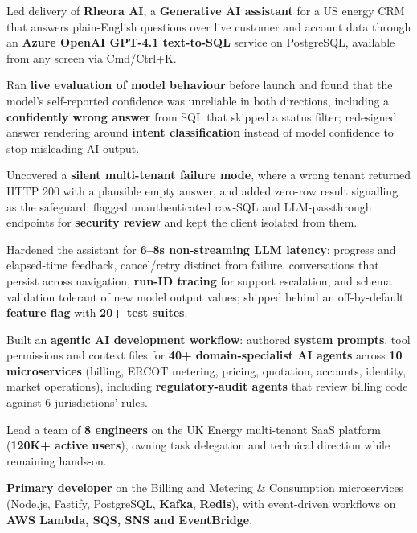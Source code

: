 \documentclass[letterpaper,11pt]{article}
\newcommand{\resumeItem}[1]{\item\small{{#1 \vspace{-2pt}}}}
\begin{document}
    \resumeItem{Led delivery of \textbf{Rheora AI}, a \textbf{Generative AI assistant} for a US energy CRM that answers plain-English questions over live customer and account data through an \textbf{Azure OpenAI GPT-4.1 text-to-SQL} service on PostgreSQL, available from any screen via Cmd/Ctrl+K.}

    \resumeItem{Ran \textbf{live evaluation of model behaviour} before launch and found that the model's self-reported confidence was unreliable in both directions, including a \textbf{confidently wrong answer} from SQL that skipped a status filter; redesigned answer rendering around \textbf{intent classification} instead of model confidence to stop misleading AI output.}

    \resumeItem{Uncovered a \textbf{silent multi-tenant failure mode}, where a wrong tenant returned HTTP 200 with a plausible empty answer, and added zero-row result signalling as the safeguard; flagged unauthenticated raw-SQL and LLM-passthrough endpoints for \textbf{security review} and kept the client isolated from them.}

    \resumeItem{Hardened the assistant for \textbf{6--8s non-streaming LLM latency}: progress and elapsed-time feedback, cancel/retry distinct from failure, conversations that persist across navigation, \textbf{run-ID tracing} for support escalation, and schema validation tolerant of new model output values; shipped behind an off-by-default \textbf{feature flag} with \textbf{20+ test suites}.}

    \resumeItem{Built an \textbf{agentic AI development workflow}: authored \textbf{system prompts}, tool permissions and context files for \textbf{40+ domain-specialist AI agents} across \textbf{10 microservices} (billing, ERCOT metering, pricing, quotation, accounts, identity, market operations), including \textbf{regulatory-audit agents} that review billing code against 6 jurisdictions' rules.}

    \resumeItem{Lead a team of \textbf{8 engineers} on the UK Energy multi-tenant SaaS platform (\textbf{120K+ active users}), owning task delegation and technical direction while remaining hands-on.}

    \resumeItem{\textbf{Primary developer} on the Billing and Metering \& Consumption microservices (Node.js, Fastify, PostgreSQL, \textbf{Kafka}, \textbf{Redis}), with event-driven workflows on \textbf{AWS Lambda, SQS, SNS and EventBridge}.}
\end{document}
